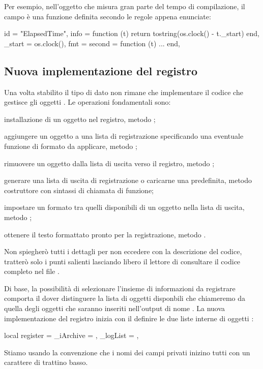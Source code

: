 Per esempio, nell'oggetto  che misura gran parte del tempo di
compilazione, il campo  è una funzione definita secondo le regole
appena enunciate:
\begin{lines}
{
    id = "ElapsedTime",
    info = function (t)
        return tostring(os.clock() - t._start)
    end,
    _start = os.clock(),
    fmt = {
        second = function (t) ... end,
    }
}
\end{lines}


\subsection{Nuova implementazione del registro}

Una volta stabilito il tipo di dato non rimane che implementare il codice che
gestisce gli oggetti . Le operazioni fondamentali sono:
\begin{compactitemize}
\item installazione di un oggetto  nel registro, metodo ;
\item aggiungere un oggetto a una lista di registrazione specificando una
eventuale funzione di formato da applicare, metodo ;
\item rimuovere un oggetto  dalla lista di uscita verso il registro,
metodo ;
\item generare una lista di uscita di registrazione o caricarne una predefinita,
metodo costruttore con sintassi di chiamata di funzione;
\item impostare un formato tra quelli disponibili di un oggetto  nella
lista di uscita, metodo ;
\item ottenere il testo formattato pronto per la registrazione, metodo
.
\end{compactitemize}

Non spiegherò tutti i dettagli per non eccedere con la descrizione del codice,
tratterò solo i punti salienti lasciando libero il lettore di consultare il
codice completo nel file .

Di base, la possibilità di selezionare l'insieme di informazioni da registrare
comporta il dover distinguere la lista di oggetti disponbili che chiameremo
 da quella degli oggetti che saranno inseriti nell'output di
nome . La nuova implementazione del registro inizia con il
definire le due liste interne di oggetti :
\begin{lines}
local register = {
    _iArchive = {},
    _logList = {},
}
\end{lines}
Stiamo usando la convenzione che i nomi dei campi privati inizino tutti con un
carattere di trattino basso.

